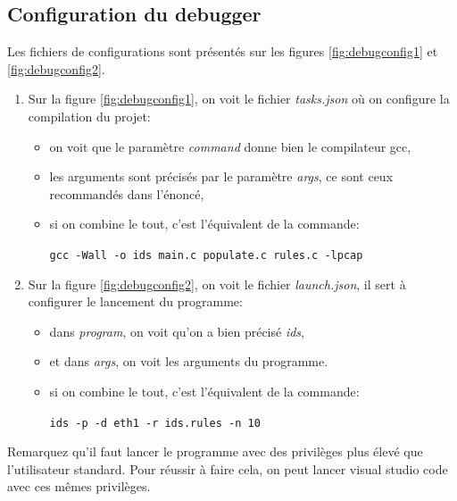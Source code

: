 \documentclass[a4paper]{article}
\begin{document}
\subsection{Configuration du debugger}



Les fichiers de configurations sont présentés sur les figures \ref{fig:debugconfig1} et \ref{fig:debugconfig2}.
\begin{enumerate}
    \item Sur la figure \ref{fig:debugconfig1}, on voit le fichier \textit{tasks.json} où on configure la compilation du projet:
    \begin{itemize}
        \item on voit que le paramètre \textit{command} donne bien le compilateur gcc,
        \item les arguments sont précisés par le paramètre \textit{args}, ce sont ceux recommandés dans l'énoncé,
        \item si on combine le tout, c'est l'équivalent de la commande:
        \begin{center}
            \texttt{\small gcc -Wall -o ids main.c populate.c rules.c -lpcap}
        \end{center}
    \end{itemize}
    \item Sur la figure \ref{fig:debugconfig2}, on voit le fichier \textit{launch.json}, il sert à configurer le lancement du programme:
    \begin{itemize}
        \item dans \textit{program}, on voit qu'on a bien précisé \textit{ids},
        \item et dans \textit{args}, on voit les arguments du programme.
        \item si on combine le tout, c'est l'équivalent de la commande:
        \begin{center}
            \texttt{\small ids -p -d eth1 -r ids.rules -n 10}
        \end{center}
    \end{itemize}
\end{enumerate}
Remarquez qu'il faut lancer le programme avec des privilèges plus élevé que l'utilisateur standard. Pour réussir à faire cela, on peut lancer visual studio code avec ces mêmes privilèges.
\end{document}
